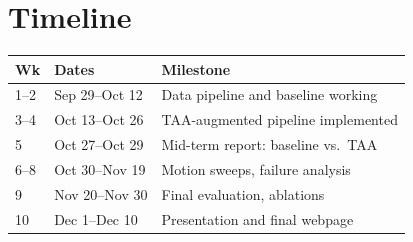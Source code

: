 \documentclass[10pt,twocolumn]{article}
\begin{document}
\section{Timeline}

\begingroup
\centering
\small
\renewcommand{\arraystretch}{0.9}
\begin{tabular}{@{}p{}p{}p{}@{}}
\toprule
\textbf{Wk} & \textbf{Dates} & \textbf{Milestone} \\
\midrule
1--2 & Sep 29--Oct 12 & Data pipeline and baseline working \\
3--4 & Oct 13--Oct 26 & TAA-augmented pipeline implemented \\
5 & Oct 27--Oct 29 & Mid-term report: baseline vs.\ TAA \\
6--8 & Oct 30--Nov 19 & Motion sweeps, failure analysis \\
9 & Nov 20--Nov 30 & Final evaluation, ablations \\
10 & Dec 1--Dec 10 & Presentation and final webpage \\
\bottomrule
\end{tabular}
\label{tab:timeline}
\endgroup
\end{document}
